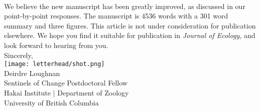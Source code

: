 \documentclass[11pt,a4paper]{article}
\begin{document}
\vspace{1.5ex}\\
We believe the new manuscript has been greatly improved, as discussed in our point-by-point responses. The manuscript is 4536 words with a 301 word summary and three figures. This article is not under consideration for publication elsewhere. We hope you find it suitable for publication in \emph{Journal of Ecology}, and look forward to hearing from you. 
\vspace{1.5ex}\\
\noindent Sincerely, \\
\texttt{[image: letterhead/shot.png]} \\ 
\noindent Deirdre Loughnan\\
\noindent Sentinels of Change Postdoctoral Fellow\\ %
\noindent Hakai Institute $|$ Department of Zoology\\
\noindent University of British Columbia
\newpage
\end{document}
